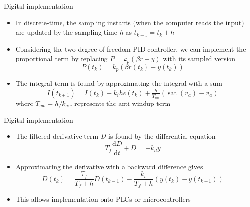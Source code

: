\documentclass{beamer-control}
\begin{document}
\begin{frame}{Digital implementation}
	\begin{itemize}
		\item In discrete-time, the sampling instants (when the computer reads the input) are updated by the sampling time $h$ as $t_{k+1}=t_k+h$
		\item Considering the two degree-of-freedom PID controller, we can implement the proportional term by replacing $P=k_p(\beta r-y)$ with its sampled version
		\[P(t_k) = k_p (\beta r(t_k)-y(t_k))\]
		\item The integral term is found by approximating the integral with a sum
		\[I(t_{k+1}) = I(t_k)+k_i h e(t_k) + \tfrac{h}{T_{aw}} (\operatorname{sat}(u_a)-u_a)\]
		where $T_{aw}=h/k_{aw}$ represents the anti-windup term
	\end{itemize}
\end{frame}

\begin{frame}{Digital implementation}
	\begin{itemize}
		\item The filtered derivative term $D$ is found by the differential equation
		\[T_f \frac{\mathrm{d}D}{\mathrm{d} t} + D = -k_d \dot{y}\]
		\item Approximating the derivative with a backward difference gives
		\[D(t_k) = \frac{T_f}{T_f+h} D(t_{k-1})-\frac{k_d}{T_f+h}(y(t_k)-y(t_{k-1}))  \]
		\item This allows implementation onto PLCs or microcontrollers
	\end{itemize}
\end{frame}

\SUMMARYFRAME
\FINALE
\end{document}
